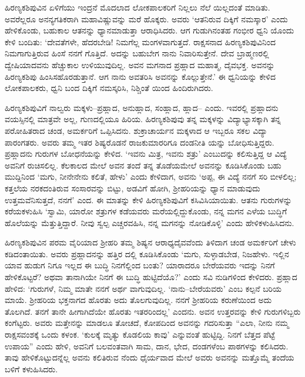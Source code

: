 ಹಿರಣ್ಯಕಶಿಪುವಿನ ಏಳಿಗೆಯು ಇಂದ್ರನೆ ಮೊದಲಾದ ಲೋಕಪಾಲಕರಿಗೆ ನಿಲ್ಲಲು ನೆಲೆ ಯಿಲ್ಲದಂತೆ ಮಾಡಿತು. ಅವರೆಲ್ಲರೂ ಅನನ್ಯಗತಿಕರಾಗಿ ಮಹಾವಿಷ್ಣುವನ್ನು ಮರೆ ಹೊಕ್ಕರು. ಅವರು ‘ಆತನಿರುವ ದಿಕ್ಕಿಗೆ ನಮಸ್ಕಾರ’ ಎಂದು ಹೇಳಿಕೊಂಡು, ಬಹುಕಾಲ ಆತನನ್ನು ಧ್ಯಾನಮಾಡುತ್ತಾ ಆರಾಧಿಸಿದರು. ಆಗ ಗುಡುಗಿನಂತಹ ಗಂಭೀರ ಧ್ವನಿ ಯೊಂದು ಕೇಳಿ ಬಂದಿತು: ‘ದೇವತೆಗಳೇ, ಹೆದರಬೇಡಿ! ನಿಮಗೆಲ್ಲ ಮಂಗಳವಾಗುತ್ತದೆ. ರಾಕ್ಷಸನಾದ ಹಿರಣ್ಯಕಶಿಪುವಿನಿಂದ ನಿಮಗಾಗುತ್ತಿರುವ ಹಿಂಸೆ ನನಗೆ ಗೊತ್ತಿದೆ. ಅದನ್ನು ಬಹುಬೇಗ ನಾನು ನಿವಾರಿಸುತ್ತೇನೆ. ದೇವ ಬ್ರಾಹ್ಮಣರಲ್ಲಿ ದ್ವೇಷಿಯಾದವನು ಹೆಚ್ಚುಕಾಲ ಉಳಿಯುವುದಿಲ್ಲ. ಅವನ ಮಗನಾದ ಪ್ರಹ್ಲಾದ ಮಹಾತ್ಮ, ದೈವಭಕ್ತ. ಅವನನ್ನು ಹಿರಣ್ಯಕಶಿಪು ಹಿಂಸಿಸಹೊರಡುತ್ತಾನೆ. ಆಗ ನಾನು ಅವತರಿಸಿ ಅವನನ್ನು ಕೊಲ್ಲುತ್ತೇನೆ.’ ಈ ಧ್ವನಿಯನ್ನು ಕೇಳಿದ ಲೋಕಪಾಲಕರು, ಧ್ವನಿ ಬಂದ ದಿಕ್ಕಿಗೆ ನಮಸ್ಕರಿಸಿ, ನಿಶ್ಚಿಂತೆ ಯಿಂದ ಹಿಂದಿರುಗಿದರು. 

ಹಿರಣ್ಯಕಶಿಪುವಿಗೆ ನಾಲ್ವರು ಮಕ್ಕಳು–ಪ್ರಹ್ಲಾದ, ಅನುಹ್ಲಾದ, ಸಂಹ್ಲಾದ, ಹ್ಲಾದ– ಎಂದು. ಇವರಲ್ಲಿ ಪ್ರಹ್ಲಾದನು ವಯಸ್ಸಿನಲ್ಲಿ ಮಾತ್ರವೇ ಅಲ್ಲ, ಗುಣದಲ್ಲಿಯೂ ಹಿರಿಯ. ಹಿರಣ್ಯಕಶಿಪುವು ತನ್ನ ಮಕ್ಕಳನ್ನು ವಿದ್ಯಾಭ್ಯಾಸಕ್ಕಾಗಿ ತನ್ನ ಪರೋಹಿತರಾದ ಚಂಡ, ಅಮರ್ಕರಿಗೆ ಒಪ್ಪಿಸಿದನು. ಶುಕ್ರಾಚಾರ್ಯನ ಮಕ್ಕಳಾದ ಆ ಇಬ್ಬರೂ ಸಕಲ ವಿದ್ಯಾ ಪಾರಂಗತರು. ಅವರು ತಮ್ಮ ಇತರ ಶಿಷ್ಯರೊಡನೆ ರಾಜಕುಮಾರರಿಗೂ ದಂಡನೀತಿ ಯನ್ನು ಬೋಧಿಸುತ್ತಿದ್ದರು. ಪ್ರಹ್ಲಾದನು ಗುರುಗಳ ಬೋಧನೆಯನ್ನು ಕೇಳಿದ. ‘ಇವನು ಮಿತ್ರ, ಇವನು ಶತ್ರು’ ಎಂಬುದನ್ನು ಕಲಿಸುತ್ತಿದ್ದ ಆ ವಿದ್ಯೆ ಅವನಿಗೆ ರುಚಿಸಲಿಲ್ಲ. ಕೆಲಕಾಲದ ಮೇಲೆ ಅವನ ತಂದೆ ತನ್ನ ತೊಡೆಯಮೇಲೆ ಅವನನ್ನು ಕೂಡಿಸಿಕೊಂಡು ಬಹು ಮುದ್ದಿನಿಂದ ‘ಮಗು, ನೀನೇನೇನು ಕಲಿತೆ, ಹೇಳು’ ಎಂದು ಕೇಳಿದಾಗ, ಅವನು ‘ಅಪ್ಪ, ಈ ವಿದ್ಯೆ ನನಗೆ ಸರಿ ಬೀಳಲಿಲ್ಲ; ಕತ್ತಲೆಯ ನರಕದಂತಿರುವ ಸಂಸಾರವನ್ನು ಬಿಟ್ಟು, ಅಡವಿಗೆ ಹೋಗಿ, ಶ್ರೀಹರಿಯನ್ನು ಧ್ಯಾನ ಮಾಡುವುದು ಉತ್ತಮವೆನಿಸುತ್ತದೆ, ನನಗೆ’ ಎಂದ. ಈ ಮಾತನ್ನು ಕೇಳಿ ಹಿರಣ್ಯಕಶಿಪುವಿಗೆ ಕಸಿವಿಸಿಯಾಯಿತು. ಆತನು ಗುರುಗಳನ್ನು ಕರೆಯಕಳುಹಿಸಿ ‘ಸ್ವಾಮಿ, ಯಾರೋ ಶತ್ರುಗಳ ಕಡೆಯವರು ಮರೆಯಲ್ಲಿದ್ದುಕೊಂಡು, ನನ್ನ ಮಗನ ಎಳೆಯ ಬುದ್ಧಿಗೆ ಹೊಲೆಯನ್ನು ಮೆತ್ತುತ್ತಿದ್ದಾರೆ. ನೀವು ಸ್ವಲ್ಪ ಎಚ್ಚರವಹಿಸಿ, ನನ್ನ ಮಗನನ್ನು ನೋಡಿಕೊಳ್ಳಿ’ ಎಂದು ಹೇಳಿಕಳುಹಿಸಿದನು.

ಹಿರಣ್ಯಕಶಿಪುವಿನ ಪರಮ ವೈರಿಯಾದ ಶ್ರೀಹರಿ ತಮ್ಮ ಶಿಷ್ಯನ ಆರಾಧ್ಯದೈವವೆಂದು ತಿಳಿದಾಗ ಚಂಡ ಅಮರ್ಕರಿಗೆ ಚೇಳು ಕಡಿದಂತಾಯಿತು. ಅವರು ಪ್ರಹ್ಲಾದನನ್ನು ಹತ್ತಿರ ದಲ್ಲಿ ಕೂಡಿಸಿಕೊಂಡು ‘ಮಗು, ಸುಳ್ಳಾಡಬೇಡ, ನಿಜಹೇಳು. ಇಲ್ಲಿನ ಯಾವ ಹುಡುಗ ನಿಗೂ ಇಲ್ಲದ ಈ ಬುದ್ಧಿ ನಿನಗೆಲ್ಲಿಂದ ಬಂತು? ಯಾರಾದರೂ ಬೇರೆಯವರು ಇದನ್ನು ನಿನಗೆ ಹೇಳಿಕೊಟ್ಟರೆ? ಅಥವಾ ತಾನಾಗಿಯೇ ನಿನಗೆ ಈ ಬುದ್ಧಿ ಹುಟ್ಟಿದೆಯೊ?’ ಎಂದು ಸವಿ ನುಡಿಗಳಿಂದ ಕೇಳಿದರು. ಪ್ರಹ್ಲಾದ ಹೇಳಿದ: ‘ಗುರುಗಳೆ, ನಿಮ್ಮ ಮಾತೇ ನನಗೆ ಅರ್ಥ ವಾಗುವುದಿಲ್ಲ. ‘ನಾನು–ಬೇರೆಯವರು’ ಎಂಬ ಕಲ್ಪನೆ ಬರಿಯ ಮಾಯೆ. ಶ್ರೀಹರಿಯ ಭಕ್ತನಾಗದ ಹೊರತು ಅದು ತೊಲಗುವುದಿಲ್ಲ. ನನಗೆ ಶ್ರೀಹರಿಯ ಕರುಣೆಯಿಂದ ಅದು ತೊಲಗಿದೆ. ತನಗೆ ತಾನೇ ಹೀಗಾಗಿದೆಯೇ ಹೊರತು ಇತರರಿಂದಲ್ಲ’ ಎಂದನು. ಅವನ ಉತ್ತರವನ್ನು ಕೇಳಿ ಗುರುಗಳಿಬ್ಬರು ಕಂಗೆಟ್ಟರು. ಅವರು ಮತ್ತೇನನ್ನು ಮಾಡಲೂ ತೋಚದೆ, ಕೋಪದಿಂದ ಅವನನ್ನು ಗದರಿಸುತ್ತಾ “ಎಲಾ, ನೀನು ನಮ್ಮ ರಾಕ್ಷಸವಂಶಕ್ಕೆ ಒಂದು ಕಳಂಕ. ‘ಕುಲಕ್ಕೆ ಮೃತ್ಯು ಕೊಡಲಿಯ ಕಾವು’ ಎನ್ನುವಂತೆ ಹುಟ್ಟಿದ್ದಿ. ನಿನಗೆ ಬೆತ್ತದ ಪೆಟ್ಟೆ ಉಪಾಯ” ಎಂದು ಹೇಳಿ, ಅವನಿಗೆ ಬಲವಂತವಾಗಿ ಸಾಮ, ದಾನ, ಭೇದ, ದಂಡಗಳೆಂಬ ಪಾಠಗಳನ್ನು ಕಲಿಸಿದರು. ತಾವು ಹೇಳಿಕೊಟ್ಟುದನ್ನೆಲ್ಲ ಅವನು ಕಲಿತಿರುವ ನೆಂದು ಧೈರ್ಯವಾದ ಮೇಲೆ ಅವರು ಅವನನ್ನು ಮತ್ತೊಮ್ಮೆ ತಂದೆಯ ಬಳಿಗೆ ಕಳುಹಿಸಿದರು.

